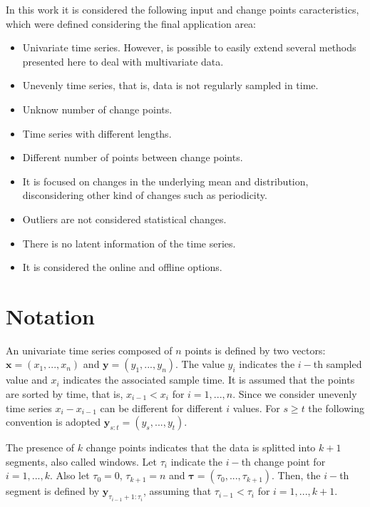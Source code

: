 In this work it is considered the following input and change points caracteristics, which were defined considering the final application area:
\begin{itemize}
    \item Univariate time series. However, is possible to easily extend several methods presented here to deal with multivariate data.
    \item Unevenly time series, that is, data is not regularly sampled in time.
    \item Unknow number of change points.
    \item Time series with different lengths.
    \item Different number of points between change points.
    \item It is focused on changes in the underlying mean and distribution, disconsidering other kind of changes such as periodicity.
    \item Outliers are not considered statistical changes.
    \item There is no latent information of the time series.
    \item It is considered the online and offline options.
\end{itemize}

\section{Notation}

An univariate time series composed of $n$ points is defined by two vectors: $\mathbf{x} = (x_{1}, ..., x_{n})$ and $\mathbf{y} = (y_{1}, ..., y_{n})$. The value $y_{i}$ indicates the $i-$th sampled value and $x_{i}$ indicates the associated sample time. It is assumed that the points are sorted by time, that is, $x_{i - 1} < x_{i}$ for $i = 1, ..., n$. Since we consider unevenly time series $x_{i} - x_{i - 1}$ can be different for different $i$ values. For $s \ge t$ the following convention is adopted $\mathbf{y}_{s:t} = (y_{s}, ..., y_{t})$.

The presence of $k$ change points indicates that the data is splitted into $k+1$ segments, also called windows. Let $\tau_{i}$ indicate the $i-$th change point for $i=1,...,k$. Also let $\tau_{0} = 0$, $\tau_{k + 1} = n$ and $\boldsymbol \tau = (\tau_{0}, ..., \tau_{k + 1})$. Then, the $i-$th segment is defined by $\mathbf{y}_{\tau_{i - 1} + 1 : \tau_{i}}$, assuming that $\tau_{i - 1} < \tau_{i}$ for $i = 1, ..., k + 1$.

